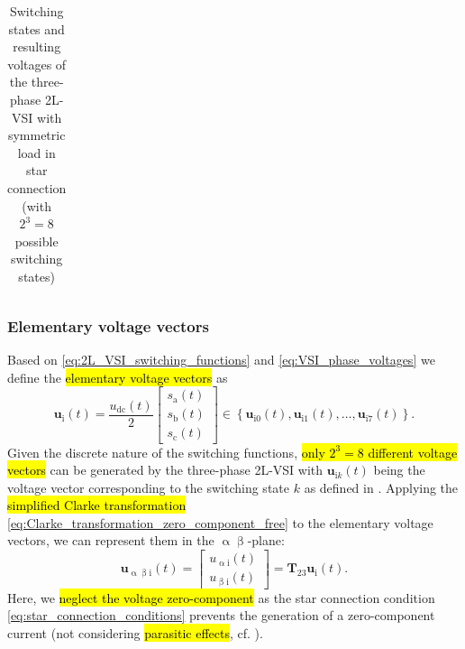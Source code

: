 \begin{frame}[b]
\begin{table}
\begin{tabular}{c c c c c c c c c c c c c c}
            \bottomrule
        \end{tabular}
        \caption{Switching states and resulting voltages of the three-phase 2L-VSI with symmetric load in star connection (with $2^3=8$ possible switching states)}
        \label{tab:2L_VSI_Switching_states_resulting_voltages_star_connection}
    \end{table}
\end{frame}

\begin{frame}
    \frametitle{Elementary voltage vectors}
    Based on \eqref{eq:2L_VSI_switching_functions} and \eqref{eq:VSI_phase_voltages} we define the \hl{elementary voltage vectors} as
    \begin{equation}
        \bm{u}_{\mathrm{i}}(t) = \frac{u_\mathrm{dc}(t)}{2} \begin{bmatrix}
            s_\mathrm{a}(t) \\
            s_\mathrm{b}(t) \\
            s_\mathrm{c}(t)
        \end{bmatrix}\in \left\{\bm{u}_{\mathrm{i}0}(t), \bm{u}_{\mathrm{i}1}(t), \ldots, \bm{u}_{\mathrm{i}7}(t) \right\}.
    \end{equation}\pause
    Given the discrete nature of the switching functions, \hl{only $2^3=8$ different voltage vectors} can be generated by the three-phase 2L-VSI  with $\bm{u}_{\mathrm{i}k}(t)$ being the voltage vector corresponding to the switching state $k$ as defined in . \pause Applying the \hl{simplified Clarke transformation} \eqref{eq:Clarke_transformation_zero_component_free} to the elementary voltage vectors, we can represent them in the $\upalpha\upbeta$-plane:
    \begin{equation}
        \bm{u}_\mathrm{\upalpha\upbeta i}(t) = \begin{bmatrix}
            u_\mathrm{\upalpha i}(t) \\
            u_\mathrm{\upbeta i}(t)
        \end{bmatrix}= \bm{T}_{23}\bm{u}_\mathrm{i}(t).
    \end{equation}
    Here, we \hl{neglect the voltage zero-component} as the star connection condition \eqref{eq:star_connection_conditions} prevents the generation of a zero-component current (not considering \hl{parasitic effects}, cf. ).
\end{frame}

